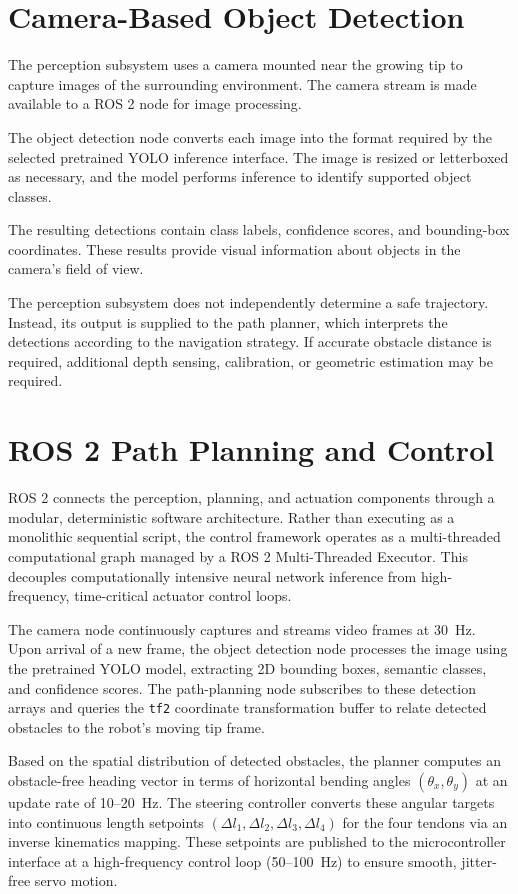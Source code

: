 \section{Camera-Based Object Detection}

The perception subsystem uses a camera mounted near the growing tip to capture images of the surrounding environment. The camera stream is made available to a ROS 2 node for image processing.

The object detection node converts each image into the format required by the selected pretrained YOLO inference interface. The image is resized or letterboxed as necessary, and the model performs inference to identify supported object classes.

The resulting detections contain class labels, confidence scores, and bounding-box coordinates. These results provide visual information about objects in the camera's field of view.

The perception subsystem does not independently determine a safe trajectory. Instead, its output is supplied to the path planner, which interprets the detections according to the navigation strategy. If accurate obstacle distance is required, additional depth sensing, calibration, or geometric estimation may be required.

\section{ROS 2 Path Planning and Control}

ROS 2 connects the perception, planning, and actuation components through a modular, deterministic software architecture. Rather than executing as a monolithic sequential script, the control framework operates as a multi-threaded computational graph managed by a ROS 2 Multi-Threaded Executor. This decouples computationally intensive neural network inference from high-frequency, time-critical actuator control loops.

The camera node continuously captures and streams video frames at 30~Hz. Upon arrival of a new frame, the object detection node processes the image using the pretrained YOLO model, extracting 2D bounding boxes, semantic classes, and confidence scores. The path-planning node subscribes to these detection arrays and queries the \texttt{tf2} coordinate transformation buffer to relate detected obstacles to the robot's moving tip frame.

Based on the spatial distribution of detected obstacles, the planner computes an obstacle-free heading vector in terms of horizontal bending angles $(\theta_x, \theta_y)$ at an update rate of 10--20~Hz. The steering controller converts these angular targets into continuous length setpoints $(\Delta l_1, \Delta l_2, \Delta l_3, \Delta l_4)$ for the four tendons via an inverse kinematics mapping. These setpoints are published to the microcontroller interface at a high-frequency control loop (50--100~Hz) to ensure smooth, jitter-free servo motion.


